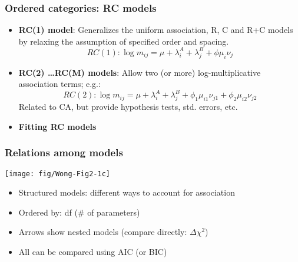 \begin{frame}[fragile]
  \frametitle{Ordered categories: RC models}
  \begin{itemize}
    \item{\large\bfseries RC(1) model}:  Generalizes the uniform association, R, C and
	R+C models by relaxing the assumption of specified order and spacing.
	  \[RC(1): \log  m_{ij} = \mu + \lambda_i^A + \lambda_j^B  + \phi \mu_i \nu_j \]
    \item{\large\bfseries RC(2) \dots RC(M) models}:  Allow two (or more) log-multiplicative association terms; e.g.:
	  \[RC(2): \log  m_{ij} = \mu + \lambda_i^A + \lambda_j^B  + \phi_1 \mu_{i1} \nu_{j1} + \phi_2 \mu_{i2} \nu_{j2} \]
	  Related to CA, but provide hypothesis tests, std. errors, etc.
	
	
	\item{\large\bfseries Fitting RC models}
	
  \end{itemize}
  
\end{frame}

\begin{frame}
  \frametitle{Relations among models}
 \begin{minipage}[c]{.6\linewidth}
  \texttt{[image: fig/Wong-Fig2-1c]}
 \end{minipage}%
 \hfill
 \begin{minipage}[c]{.39\linewidth}
 	\begin{itemize}
		\item Structured models: different ways to account for association
		\item Ordered by: df (\# of parameters)
		\item Arrows show nested models (compare directly: $\Delta \chi^2$)
		\item All can be compared using AIC (or BIC)
	\end{itemize}

 \end{minipage}
\end{frame}


